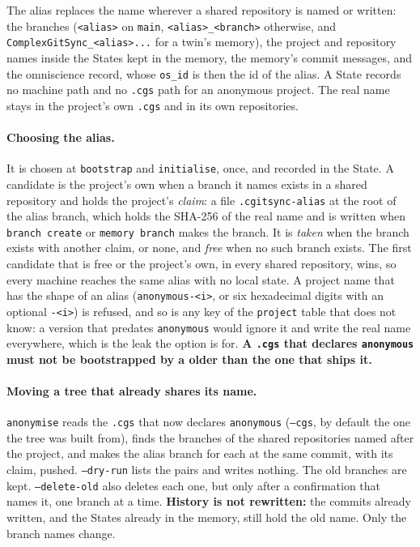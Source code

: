 The alias replaces the name wherever a shared repository is named or written:
the branches (\texttt{<alias>} on \texttt{main}, \texttt{<alias>\_<branch>}
otherwise, and \texttt{ComplexGitSync\_<alias>...} for a twin's memory), the
project and repository names inside the States kept in the memory, the
memory's commit messages, and the omniscience record, whose \texttt{os\_id} is
then the id of the alias. A State records no machine path and no
\texttt{.cgs} path for an anonymous project. The real name stays in the
project's own \texttt{.cgs} and in its own repositories.

\paragraph{Choosing the alias.} It is chosen at \texttt{bootstrap} and
\texttt{initialise}, once, and recorded in the State. A candidate is the
project's own when a branch it names exists in a shared repository and holds
the project's \emph{claim}: a file \texttt{.cgitsync-alias} at the root of the
alias branch, which holds the SHA-256 of the real name and is written when
\texttt{branch create} or \texttt{memory branch} makes the branch. It is
\emph{taken} when the branch exists with another claim, or none, and
\emph{free} when no such branch exists. The first candidate that is free or
the project's own, in every shared repository, wins, so every machine reaches
the same alias with no local state. A project name that has the shape of an
alias (\texttt{anonymous-<i>}, or six hexadecimal digits with an optional
\texttt{-<i>}) is refused, and so is any key of the \texttt{project} table that
\cgspkg{} does not know: a version that predates \texttt{anonymous} would
ignore it and write the real name everywhere, which is the leak the option is
for. \textbf{A \texttt{.cgs} that declares \texttt{anonymous} must not be
bootstrapped by a \cgspkg{} older than the one that ships it.}

\paragraph{Moving a tree that already shares its name.} \texttt{anonymise}
reads the \texttt{.cgs} that now declares \texttt{anonymous} (\texttt{--cgs},
by default the one the tree was built from), finds the branches of the shared
repositories named after the project, and makes the alias branch for each at
the same commit, with its claim, pushed. \texttt{--dry-run} lists the pairs
and writes nothing. The old branches are kept. \texttt{--delete-old} also
deletes each one, but only after a confirmation that names it, one branch at a
time. \textbf{History is not rewritten:} the commits already written, and the
States already in the memory, still hold the old name. Only the branch names
change.


